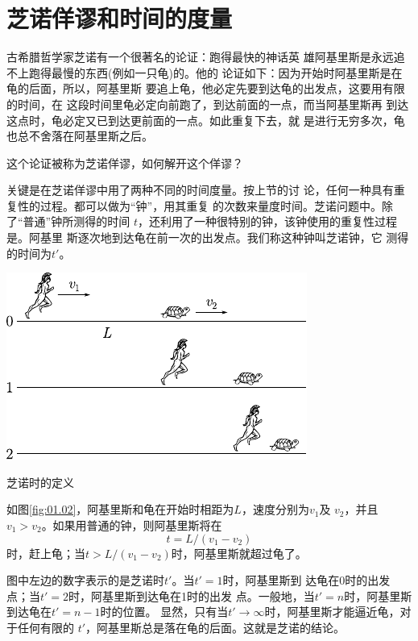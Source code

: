 \section{芝诺佯谬和时间的度量}\label{sec:01.02}

古希腊哲学家芝诺有一个很著名的论证：跑得最快的神话英
雄阿基里斯是永远追不上跑得最慢的东西(例如一只龟)的。他的
论证如下：因为开始时阿基里斯是在龟的后面，所以，阿基里斯
要追上龟，他必定先要到达龟的出发点，这要用有限的时间，在
这段时间里龟必定向前跑了，到达前面的一点，而当阿基里斯再
到达这点时，龟必定又已到达更前面的一点。如此重复下去，就
是进行无穷多次，龟也总不舍落在阿基里斯之后。

这个论证被称为芝诺佯谬，如何解开这个佯谬？

关键是在芝诺佯谬中用了两种不同的时间度量。按上节的讨
论，任何一种具有重复性的过程。都可以做为“钟”，用其重复
的次数来量度时间。芝诺问题中。除了“普通”钟所测得的时间
$t$，还利用了一种很特别的钟，该钟使用的重复性过程是。阿基里
斯逐次地到达龟在前一次的出发点。我们称这种钟叫芝诺钟，它
测得的时间为$t'$。

\begin{figurex}[!h]
    \centering
    \includegraphics{figure/fig01.02}
    \caption{芝诺时的定义}
    \label{fig:01.02}
\end{figurex}
如图\ref{fig:01.02}，阿基里斯和龟在开始时相距为$L$，速度分别为$v_1$及
$v_2$，并且$v_1>v_2$。如果用普通的钟，则阿基里斯将在
\begin{equation}
    t=L/(v_1-v_2)
    \label{eqn:01.02.01}
\end{equation}
时，赶上龟；当$t>L/(v_1-v_2)$时，阿基里斯就超过龟了。

图中左边的数字表示的是芝诺时$t'$。当$t'=1$时，阿基里斯到
达龟在0时的出发点；当$t'=2$时，阿基里斯到达龟在1时的出发
点。一般地，当$t'=n$时，阿基里斯到达龟在$t'=n-1$时的位置。
显然，只有当$t'\rightarrow\infty$时，阿基里斯才能逼近龟，对于任何有限的
$t'$，阿基里斯总是落在龟的后面。这就是芝诺的结论。


